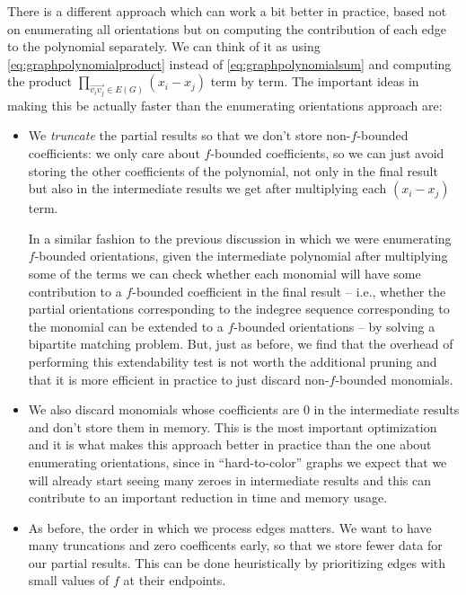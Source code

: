 There is a different approach which can work a bit better in practice, based not on enumerating
all orientations but on computing the contribution of each edge to the polynomial separately. 
We can think of it as using \eqref{eq:graphpolynomialproduct} instead of \eqref{eq:graphpolynomialsum} and
computing the product $\prod_{\overrightarrow{v_iv_j} \in E(G)} (x_i - x_j)$ term by term.
The important ideas in making this be actually faster than the enumerating orientations approach are:

\begin{itemize}
	\item We \emph{truncate} the partial results so that we don't store non-$f$-bounded coefficients:
	we only care about $f$-bounded coefficients, so we can just avoid storing the other coefficients of the 
	polynomial, not only in the final result but also in the intermediate results we get after multiplying each
	$(x_i-x_j)$ term. 
	
	In a similar fashion to the previous discussion in which we were enumerating $f$-bounded orientations, given 
	the intermediate polynomial after multiplying some of the terms we can check whether each monomial will have
	some contribution to a $f$-bounded coefficient in the final result -- i.e., whether the partial orientations
	corresponding to the indegree sequence corresponding to the monomial can be extended to a $f$-bounded orientations
	-- by solving a bipartite matching problem. But, just as before, we find that the overhead of performing this
	extendability test is not worth the additional pruning and that it is more efficient in practice to just discard
	non-$f$-bounded monomials. 
	
	
	\item We also discard monomials whose coefficients are $0$ in the intermediate results and don't store them in
	memory. This is the most important optimization and it is what makes this approach better in practice than the
	one about enumerating orientations, since in ``hard-to-color'' graphs we expect that we will already start seeing
	many zeroes in intermediate results and this can contribute to an important reduction in time and memory usage.
	
	\item As before, the order in which we process edges matters. We want to have many truncations and 
	zero coefficents early, so that we store fewer data for our partial results. This can be done heuristically 
	by prioritizing edges with small values of $f$ at their endpoints. 

\end{itemize}


